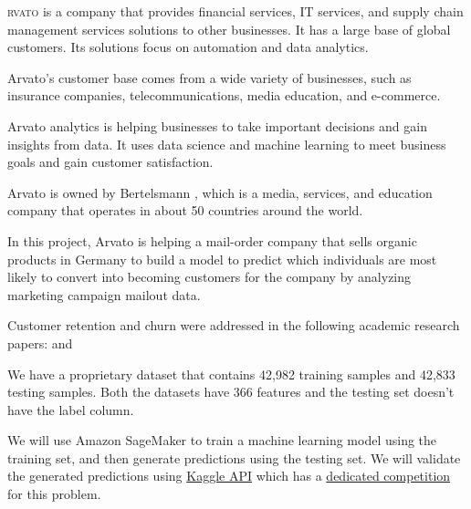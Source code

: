 \documentclass[a4paper]{article}
\begin{document}
  {



    \lettrine[lines=3,findent=2pt, lraise=0.2]{}{rvato} is a company that provides financial services, IT services, and supply chain management services solutions to other businesses. It has a large base of global customers. Its solutions focus on automation and data analytics.\cite{arvato-company}

    Arvato's customer base comes from a wide variety of businesses, such as insurance companies, telecommunications, media education, and e-commerce. 

    Arvato analytics is helping businesses to take important decisions and gain insights from data. It uses data science and machine learning to meet business goals and gain customer satisfaction.

    Arvato is owned by Bertelsmann \cite{bertelsmann-company}, which is a media, services, and education company that operates in about 50 countries around the world.

    In this project, Arvato is helping a mail-order company that sells organic products in Germany to build a model to predict which individuals are most likely to convert into becoming customers for the company by analyzing marketing campaign mailout data.

    Customer retention and churn were addressed in the following academic research papers: 
    \parencite{al-shatnwai_predicting_2020} and \cite{zhuang_research_2018}

    We have a proprietary dataset that contains 42,982 training samples and 42,833 testing samples. Both the datasets have 366 features and the testing set doesn't have the label column.

    We will use Amazon SageMaker to train a machine learning model using the training set, and then generate predictions using the testing set. We will validate the generated predictions using \href{https://www.kaggle.com/docs/api}{Kaggle API} which has a \href{https://www.kaggle.com/c/udacity-arvato-identify-customers}{dedicated competition} for this problem.


}
\end{document}
